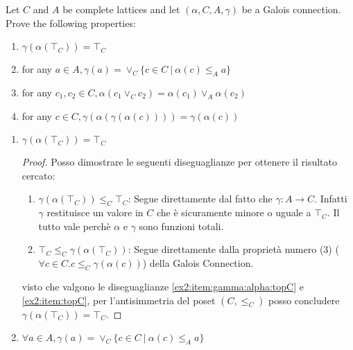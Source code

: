 {Let $C$ and $A$ be complete lattices and let $(\alpha, C, A, \gamma)$ be a Galois connection. Prove the following properties:
\begin{enumerate}
	\item $\gamma(\alpha(\top_C)) = \top_C$
	\item for any $a \in A, \gamma(a) = \vee_C \{c \in C\ |\ \alpha(c) \leq_A a \}$ 
	\item for any $c_1, c_2 \in C, \alpha(c_1 \vee_C c_2) = \alpha(c_1) \vee_A \alpha(c_2)$
	\item for any $c \in C, \gamma(\alpha(\gamma(\alpha(c)))) = \gamma(\alpha(c))$
\end{enumerate}	
}
{
\begin{enumerate}
	\item $\boxed{\gamma(\alpha(\top_C)) = \top_C}$
	\begin{proof}
	Posso dimostrare le seguenti diseguaglianze per ottenere il risultato cercato:
	\begin{enumerate}
		\item
		\label{ex2:item:gamma:alpha:topC}
		$\gamma(\alpha(\top_C)) \leq_C \top_C$: Segue direttamente dal fatto che $\gamma:A \to C$.
		Infatti $\gamma$ restituisce un valore in $C$ che è sicuramente minore o uguale a $\top_C$.
		Il tutto vale perchè $\alpha$ e $\gamma$ sono funzioni totali.
		
		\item
		\label{ex2:item:topC}
		 $\top_C \leq_C \gamma(\alpha(\top_C))$: Segue direttamente dalla proprietà numero (3)
		($\forall c \in C . c \leq_C \gamma(\alpha(c))$) della Galois Connection.
	\end{enumerate}
	visto che valgono le diseguaglianze \ref{ex2:item:gamma:alpha:topC} e \ref{ex2:item:topC}, per l'antisimmetria del poset $(C, \leq_C)$ posso concludere
	$\gamma(\alpha(\top_C)) = \top_C$.
	\end{proof}
	\item $\boxed{\forall a \in A, \gamma(a) = \vee_C \{c \in C\ |\ \alpha(c) \leq_A a \}}$
	

\end{enumerate}}
